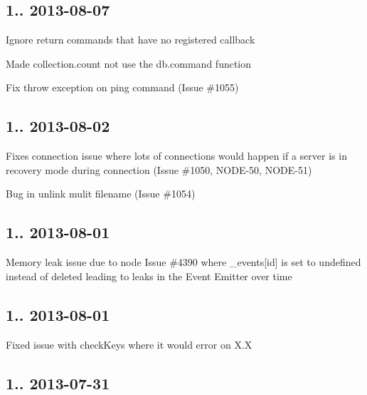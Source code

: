 \subsection*{1.. 2013-\/08-\/07 }


\begin{DoxyItemize}
\item Ignore return commands that have no registered callback
\item Made collection.\+count not use the db.\+command function
\item Fix throw exception on ping command (Issue \#1055)
\end{DoxyItemize}

\subsection*{1.. 2013-\/08-\/02 }


\begin{DoxyItemize}
\item Fixes connection issue where lots of connections would happen if a server is in recovery mode during connection (Issue \#1050, N\+O\+D\+E-\/50, N\+O\+D\+E-\/51)
\item Bug in unlink mulit filename (Issue \#1054)
\end{DoxyItemize}

\subsection*{1.. 2013-\/08-\/01 }


\begin{DoxyItemize}
\item Memory leak issue due to node Issue \#4390 where \+\_\+events\mbox{[}id\mbox{]} is set to undefined instead of deleted leading to leaks in the Event Emitter over time
\end{DoxyItemize}

\subsection*{1.. 2013-\/08-\/01 }


\begin{DoxyItemize}
\item Fixed issue with check\+Keys where it would error on X.\+X
\end{DoxyItemize}

\subsection*{1.. 2013-\/07-\/31 }


